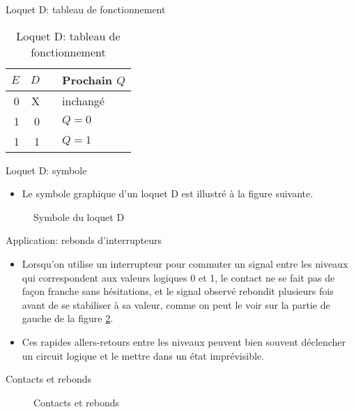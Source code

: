 \documentclass[presentation]{beamer}
\begin{document}
\begin{frame}[label={sec:org228317a}]{Loquet D: tableau de fonctionnement}
\begin{table}[htbp]
\caption{\label{tab:orgcbb2e7f}Loquet D: tableau de fonctionnement}
\centering
\begin{tabular}{rrll}
\(E\) & \(D\) &  & Prochain \(Q\)\\[0pt]
\hline
0 & X &  & inchangé\\[0pt]
1 & 0 &  & \(Q = 0\)\\[0pt]
1 & 1 &  & \(Q = 1\)\\[0pt]
\end{tabular}
\end{table}
\end{frame}

\begin{frame}[label={sec:orgc8aad51}]{Loquet D: symbole}
\begin{itemize}
\item Le symbole graphique d'un loquet D est illustré à la figure suivante.
\end{itemize}

\begin{figure}[htbp]
\centering

\caption{\label{fig:orgb4fd917}Symbole du loquet D}
\end{figure}
\end{frame}

\begin{frame}[label={sec:orgb99d1d5}]{Application: rebonds d'interrupteurs}
\begin{itemize}
\item Lorsqu'on utilise un interrupteur pour commuter un signal entre les niveaux qui correspondent aux valeurs logiques 0 et 1, le contact ne se fait pas de façon franche sans hésitations, et le signal observé rebondit plusieurs fois avant de se stabiliser à sa valeur, comme on peut le voir sur la partie de gauche de la figure \ref{fig:org1931f51}.

\item Ces rapides allers-retours entre les niveaux peuvent bien souvent déclencher un circuit logique et le mettre dans un état imprévisible.
\end{itemize}
\end{frame}

\begin{frame}[label={sec:org3ed0b67}]{Contacts et rebonds}
\begin{figure}[htbp]
\centering

\caption{\label{fig:org1931f51}Contacts et rebonds}
\end{figure}
\end{frame}
\end{document}
